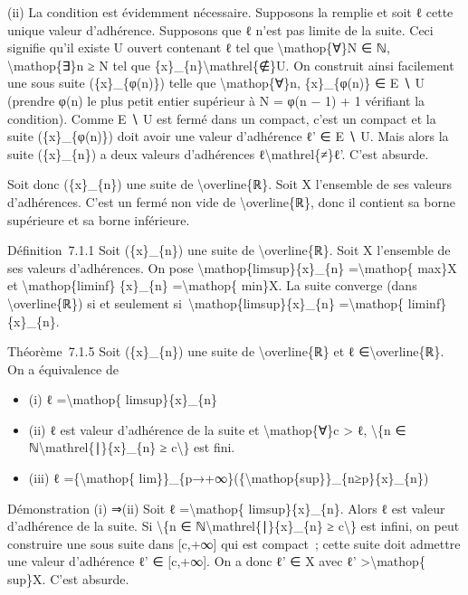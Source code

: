 \documentclass[]{article}
\begin{document}
(ii) La condition est évidemment nécessaire. Supposons la remplie et
soit ℓ cette unique valeur d'adhérence. Supposons que ℓ n'est pas limite
de la suite. Ceci signifie qu'il existe U ouvert contenant ℓ tel que
\textbackslash{}mathop\{∀\}N ∈ ℕ, \textbackslash{}mathop\{∃\}n ≥ N tel
que \{x\}\_\{n\}\textbackslash{}mathrel\{∉\}U. On construit ainsi
facilement une sous suite (\{x\}\_\{φ(n)\}) telle que
\textbackslash{}mathop\{∀\}n, \{x\}\_\{φ(n)\} ∈ E ∖ U (prendre φ(n) le
plus petit entier supérieur à N = φ(n − 1) + 1 vérifiant la condition).
Comme E ∖ U est fermé dans un compact, c'est un compact et la suite
(\{x\}\_\{φ(n)\}) doit avoir une valeur d'adhérence ℓ' ∈ E ∖ U. Mais
alors la suite (\{x\}\_\{n\}) a deux valeurs d'adhérences
ℓ\textbackslash{}mathrel\{≠\}ℓ'. C'est absurde.

Soit donc (\{x\}\_\{n\}) une suite de \textbackslash{}overline\{ℝ\}.
Soit X l'ensemble de ses valeurs d'adhérences. C'est un fermé non vide
de \textbackslash{}overline\{ℝ\}, donc il contient sa borne supérieure
et sa borne inférieure.

Définition~7.1.1 Soit (\{x\}\_\{n\}) une suite de
\textbackslash{}overline\{ℝ\}. Soit X l'ensemble de ses valeurs
d'adhérences. On pose \textbackslash{}mathop\{limsup\}\{x\}\_\{n\}
=\textbackslash{}mathop\{ max\}X et \textbackslash{}mathop\{liminf\}
\{x\}\_\{n\} =\textbackslash{}mathop\{ min\}X. La suite converge (dans
\textbackslash{}overline\{ℝ\}) si et seulement
si~\textbackslash{}mathop\{limsup\}\{x\}\_\{n\}
=\textbackslash{}mathop\{ liminf\} \{x\}\_\{n\}.

Théorème~7.1.5 Soit (\{x\}\_\{n\}) une suite de
\textbackslash{}overline\{ℝ\} et ℓ ∈\textbackslash{}overline\{ℝ\}. On a
équivalence de

\begin{itemize}
\itemsep1pt\parskip0pt
\item
  (i) ℓ =\textbackslash{}mathop\{ limsup\}\{x\}\_\{n\}
\item
  (ii) ℓ est valeur d'adhérence de la suite et
  \textbackslash{}mathop\{∀\}c \textgreater{} ℓ, \textbackslash{}\{n ∈
  ℕ\textbackslash{}mathrel\{∣\}\{x\}\_\{n\} ≥ c\textbackslash{}\} est
  fini.
\item
  (iii) ℓ =\{\textbackslash{}mathop\{
  lim\}\}\_\{p→+∞\}(\{\textbackslash{}mathop\{sup\}\}\_\{n≥p\}\{x\}\_\{n\})
\end{itemize}

Démonstration (i) ⇒(ii) Soit ℓ =\textbackslash{}mathop\{
limsup\}\{x\}\_\{n\}. Alors ℓ est valeur d'adhérence de la suite. Si
\textbackslash{}\{n ∈ ℕ\textbackslash{}mathrel\{∣\}\{x\}\_\{n\} ≥
c\textbackslash{}\} est infini, on peut construire une sous suite dans
{[}c,+∞{]} qui est compact~; cette suite doit admettre une valeur
d'adhérence ℓ' ∈ {[}c,+∞{]}. On a donc ℓ' ∈ X avec ℓ'
\textgreater{}\textbackslash{}mathop\{ sup\}X. C'est absurde.
\end{document}
